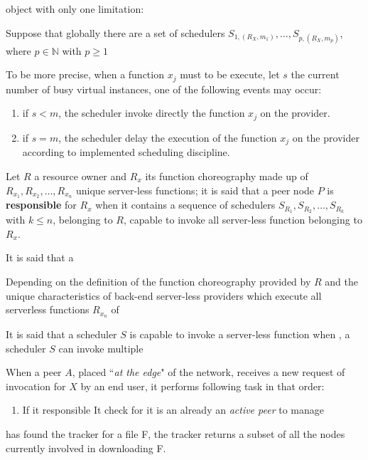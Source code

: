 \documentclass[10pt,a4paper]{article}
\begin{document}
 object with only one limitation:

Suppose that globally there are a set of schedulers $S_{1,({R_{X}},m_1)}, \ldots , S_{p,({R_{X}},m_p)}$, where $p \in \mathbb{N}$ with $p \geq 1$



To be more precise, when a function $x_j$ must to be execute, let $s$ the current number of busy virtual instances, one of the following events may occur:
\begin{enumerate}
\item if $s < m$, the scheduler invoke directly the function $x_j$ on the provider.
\item if $s = m$, the scheduler delay the execution of the function $x_j$ on the provider according to implemented scheduling discipline.
\end{enumerate}








Let $R$ a resource owner and $R_x$ its function choreography made up of $R_{x_1}, R_{x_2}, \ldots, R_{x_n}$ unique server-less functions; it is said that a peer node $P$ is \textbf{responsible} for $R_x$ when it contains a sequence of schedulers $S_{R_1}, S_{R_2}, \ldots, S_{R_k}$ with $k \leq n$, belonging to $R$, capable to invoke all server-less function belonging to $R_x$. 

It is said that a 

Depending on the definition of the function choreography provided by $R$ and the unique characteristics of back-end server-less providers which execute all serverless functions $R_{x_n}$ of 




It is said that a scheduler $S$ is capable to invoke a server-less function when 
, a scheduler $S$ can invoke multiple




When a peer $A$, placed ``\textit{at the edge}" of the network, receives a new request of invocation for $X$ by an end user, it performs following task in that order:

\begin{enumerate}
\item If it responsible It check for it is an already an \textit{active peer} to manage 
\end{enumerate}




 has found the tracker for a file F, the tracker returns a subset
of all the nodes currently involved in downloading F.
\end{document}
